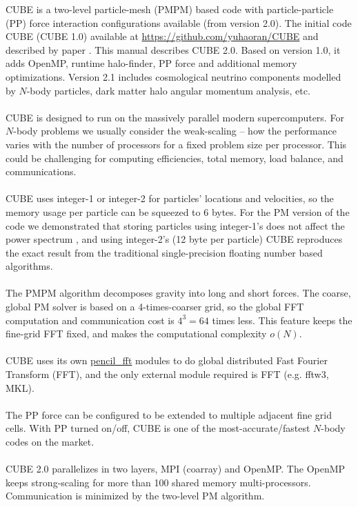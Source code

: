 \documentclass[12pt]{article}
\begin{document}
CUBE is a two-level particle-mesh (PMPM) based code with particle-particle (PP) force interaction configurations available (from version 2.0). The initial code CUBE (CUBE 1.0) available at \url{https://github.com/yuhaoran/CUBE} and described by paper \cite{2018ApJS..237...24Y}. This manual describes CUBE 2.0. Based on version 1.0, it adds OpenMP, runtime halo-finder, PP force and additional memory optimizations. Version 2.1 includes cosmological neutrino components modelled by $N$-body particles, dark matter halo angular momentum analysis, etc.
\\\\
CUBE is designed to run on the massively parallel modern supercomputers. For $N$-body problems we usually consider the weak-scaling -- how the performance varies with the number of processors for a fixed problem size per processor. This could be challenging for computing efficiencies, total memory, load balance, and communications. 
\\\\
CUBE uses integer-1 or integer-2 for particles' locations and velocities, so the memory usage per particle can be squeezed to 6 bytes. For the PM version of the code we demonstrated that storing particles using integer-1's does not affect the power spectrum \cite{2018ApJS..237...24Y}, and using integer-2's (12 byte per particle) CUBE reproduces the exact result from the traditional single-precision floating number based algorithms.
\\\\
The PMPM algorithm decomposes gravity into long and short forces. The coarse, global PM solver is based on a 4-times-coarser grid, so the global FFT computation and communication cost is $4^3=64$ times less. This feature keeps the fine-grid FFT fixed, and makes the computational complexity $o(N)$.
\\\\
CUBE uses its own \url{pencil_fft} modules to do global distributed Fast Fourier Transform (FFT), and the only external module required is FFT (e.g. fftw3, MKL).
\\\\
The PP force can be configured to be extended to multiple adjacent fine grid cells. With PP turned on/off, CUBE is one of the most-accurate/fastest $N$-body codes on the market.
\\\\
CUBE 2.0 parallelizes in two layers, MPI (coarray) and OpenMP. The OpenMP keeps strong-scaling for more than 100 shared memory multi-processors. Communication is minimized by the two-level PM algorithm.
\end{document}
